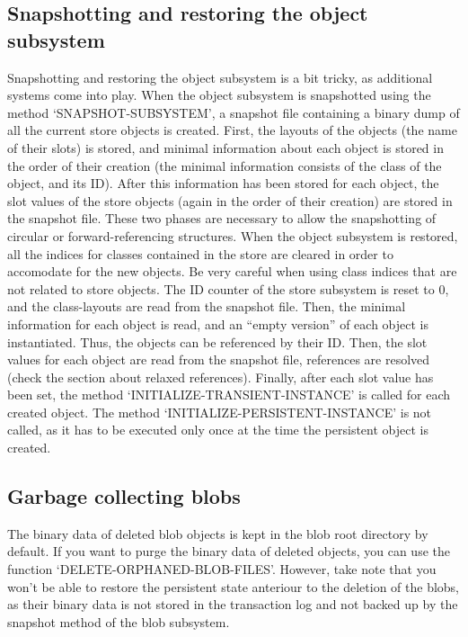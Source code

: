\subsection{ Snapshotting and restoring the object subsystem}
Snapshotting and restoring the object subsystem is a bit tricky,
as additional systems come into play. When the object subsystem is
snapshotted using the method `SNAPSHOT-SUBSYSTEM', a snapshot file
containing a binary dump of all the current store objects is
created. First, the layouts of the objects (the name of their
slots) is stored, and minimal information about each object is
stored in the order of their creation (the minimal information
consists of the class of the object, and its ID). After this
information has been stored for each object, the slot values of
the store objects (again in the order of their creation) are
stored in the snapshot file. These two phases are necessary to
allow the snapshotting of circular or forward-referencing
structures.
When the object subsystem is restored, all the indices for classes
contained in the store are cleared in order to accomodate for the
new objects. Be very careful when using class indices that are not
related to store objects. The ID counter of the store subsystem is
reset to 0, and the class-layouts are read from the snapshot
file. Then, the minimal information for each object is read, and
an ``empty version'' of each object is instantiated. Thus, the
objects can be referenced by their ID. Then, the slot values for
each object are read from the snapshot file, references are
resolved (check the section about relaxed references). Finally,
after each slot value has been set, the method
`INITIALIZE-TRANSIENT-INSTANCE' is called for each created
object. The method `INITIALIZE-PERSISTENT-INSTANCE' is not called,
as it has to be executed only once at the time the persistent
object is created.


\subsection{ Garbage collecting blobs}
The binary data of deleted blob objects is kept in the blob root
directory by default. If you want to purge the binary data of
deleted objects, you can use the function
`DELETE-ORPHANED-BLOB-FILES'. However, take note that you won't be
able to restore the persistent state anteriour to the deletion of
the blobs, as their binary data is not stored in the transaction
log and not backed up by the snapshot method of the blob
subsystem.


